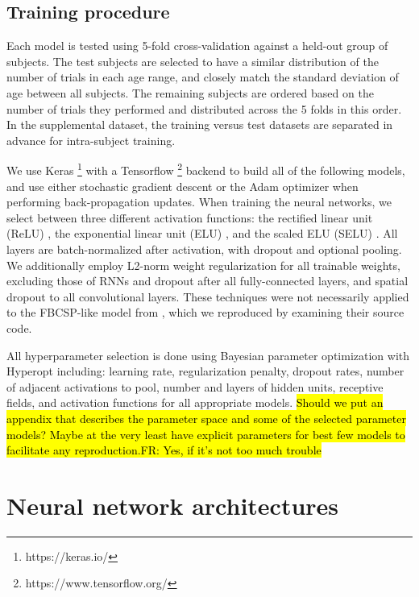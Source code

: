 \documentclass[utf8]{frontiersSCNS} %
\newcommand{\FR}[1]{{\small \textcolor{red}{\hl{FR: #1}}}}
\begin{document}
\subsection{Training procedure} \label{sec:train_proc}

Each model is tested using 5-fold cross-validation against a held-out group of subjects. The test subjects are selected to have a similar distribution of the number of trials in each age range, and closely match the standard deviation of age between all subjects. The remaining subjects are ordered based on the number of trials they performed and distributed across the 5 folds in this order. In the supplemental dataset, the training versus test datasets are separated in advance for intra-subject training.

We use Keras \footnote{https://keras.io/} with a Tensorflow \footnote{https://www.tensorflow.org/} backend to build all of the following models, and use either stochastic gradient descent or the Adam optimizer  when performing back-propagation updates. When training the neural networks, we select between three different activation functions: the rectified linear unit (ReLU) \cite{He2015a}, the exponential linear unit (ELU) \cite{Clevert}, and the scaled ELU (SELU) \cite{NIPS2017_6698}. All layers are batch-normalized \cite{Szegedy2015} after activation, with dropout and optional pooling. We additionally employ L2-norm weight regularization for all trainable weights, excluding those of RNNs and dropout \cite{} after all fully-connected layers, and spatial dropout \cite{} to all convolutional layers. These techniques were not necessarily applied to the FBCSP-like model from \cite{Schirrmeister2017}, which we reproduced by examining their source code.

All hyperparameter selection is done using Bayesian parameter optimization with Hyperopt \cite{Bergstra2013}  including: learning rate, regularization penalty, dropout rates, number of adjacent activations to pool, number and layers of hidden units, receptive fields, and activation functions for all appropriate models. \hl{Should we put an appendix that describes the parameter space and some of the selected parameter models? Maybe at the very least have explicit parameters for best few models to facilitate any reproduction.}\FR{Yes, if it's not too much trouble}

\section{Neural network architectures}
\end{document}
